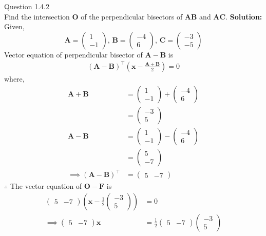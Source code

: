 \documentclass[journal,12pt,twocolumn]{IEEEtran}
\theoremstyle{remark}
\newcommand{\myvec}[1]{\ensuremath{\begin{pmatrix}#1\end{pmatrix}}}
\providecommand{\brak}[1]{\ensuremath{\left(#1\right)}}
\let\vec\mathbf
\newcommand{\solution}{\noindent \textbf{Solution: }}
\begin{document}
%

Question 1.4.2\\
Find the intersection $\vec{O}$ of the perpendicular bisectors of $\vec{AB}$ and $\vec{AC}$.
\fi
\solution \\
Given,
$$\vec{A}=\myvec{1\\-1} ,\, \vec{B}=\myvec{-4\\6} ,\, \vec{C}=\myvec{-3\\-5}$$
Vector equation of perpendicular bisector of $\vec{A}-\vec{B}$ is
\begin{align}
 (\vec{A}-\vec{B})^\top  \brak{ \vec{x} - \frac{\vec{A}+\vec{B}}{2}} = 0
\end{align}
where,
\begin{align}
\vec{A}+\vec{B}&=\myvec{1\\-1}+\myvec{-4\\6}\\
&=\myvec{-3\\5}\\
\vec{A}-\vec{B} &= \myvec{1\\-1}-\myvec{-4\\6}\\
&=\myvec{5\\-7}\\
\implies (\vec{A}-\vec{B})^\top &= \myvec{5&-7}
\end{align}
$\therefore $ The vector equation of $\vec{O}-\vec{F}$ is
\begin{align}
\myvec{5&-7} \brak{ \vec{x}-\frac{1}{2}\myvec{-3\\5} }&=0\\
\implies \myvec{5&-7}\vec{x}&=\frac{1}{2}\myvec{5&-7}\myvec{-3\\5}
\end{align}
\end{document}
